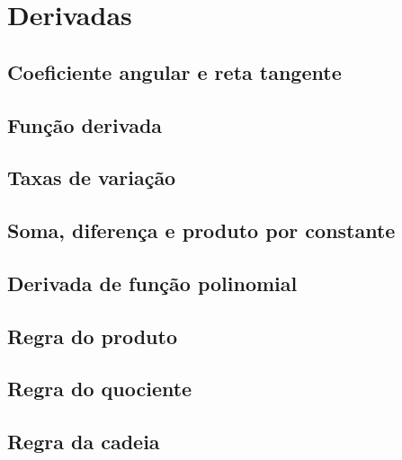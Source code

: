 
\chapter{Derivadas}\label{chap:derivadas}

\emconstrucao


\section{Coeficiente angular e reta tangente}\label{sec:derivadas_coef_angular}
\construirSec

\section{Função derivada}
\construirSec

\section{Taxas de variação}
\construirSec

\section{Soma, diferença e produto por constante}
\construirSec

\section{Derivada de função polinomial}
\construirSec

\section{Regra do produto}
\construirSec

\section{Regra do quociente}
\construirSec

\section{Regra da cadeia}
\construirSec

